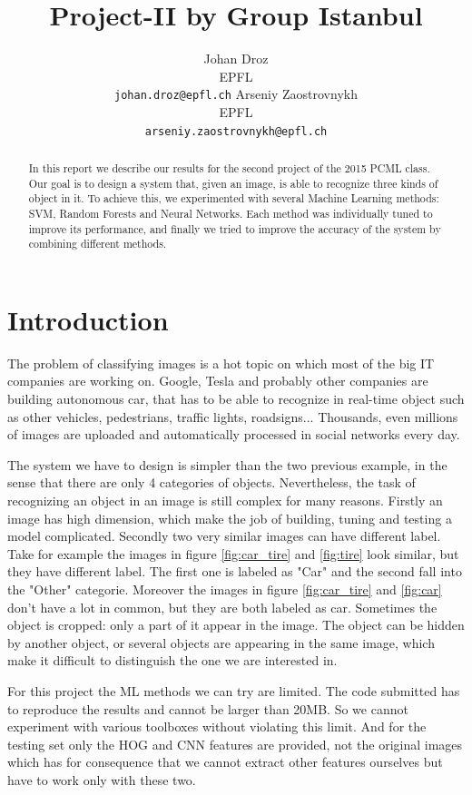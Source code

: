 \documentclass{article} %
\title{Project-II by Group Istanbul}
\author{
Johan Droz\\
EPFL \\
\texttt{johan.droz@epfl.ch} \And
Arseniy Zaostrovnykh\\
EPFL \\
\texttt{arseniy.zaostrovnykh@epfl.ch}
}
\begin{document}
\maketitle

\begin{abstract}
In this report we describe our results for the second project of the 2015 PCML class.
Our goal is to design a system that, given an image, is able to recognize three kinds of object in it.
To achieve this, we experimented with several Machine Learning methods: SVM, Random Forests and Neural Networks. Each method was individually tuned to improve its performance, and finally we tried to improve the accuracy of the system by combining different methods.

\end{abstract}

\section{Introduction}

The problem of classifying images is a hot topic on which most of the big IT companies are working on.
Google, Tesla and probably other companies are building autonomous car, that has to be able to recognize in real-time object such as other vehicles, pedestrians, traffic lights, roadsigns...
Thousands, even millions of images are uploaded and automatically processed in social networks every day.

The system we have to design is simpler than the two previous example, in the sense that there are only 4 categories of objects. Nevertheless, the task of recognizing an object in an image is still complex for many reasons.
Firstly an image has high dimension, which make the job of building, tuning and testing a model complicated.
Secondly two very similar images can have different label.
Take for example the images in figure \ref{fig:car_tire} and \ref{fig:tire} look similar, but they have different label. The first one is labeled as "Car" and the second fall into the "Other" categorie. Moreover the images in figure \ref{fig:car_tire} and \ref{fig:car} don't have a lot in common, but they are both labeled as car.
Sometimes the object is cropped: only a part of it appear in the image. The object can be hidden by another object, or several objects are appearing in the same image, which make it difficult to distinguish the one we are interested in.

For this project the ML methods we can try are limited. The code submitted has to reproduce the results and cannot be larger than 20MB. So we cannot experiment with various toolboxes without violating this limit.
And for the testing set only the HOG and CNN features are provided, not the original images which has for consequence that we cannot extract other features ourselves but have to work only with these two.
\end{document}
